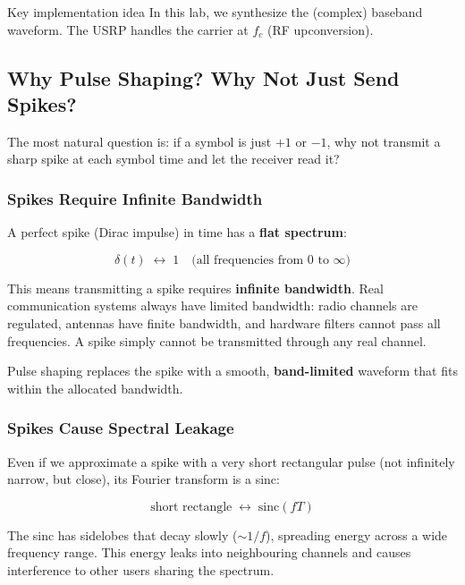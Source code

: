 \begin{KeyBox}{Key implementation idea}
In this lab, we synthesize the (complex) baseband waveform. The USRP handles the carrier at $f_c$ (RF upconversion).
\end{KeyBox}

\subsection{Why Pulse Shaping? Why Not Just Send Spikes?}

The most natural question is: if a symbol is just $+1$ or $-1$, why not transmit a sharp spike at each symbol time and let the receiver read it?

\subsubsection{Spikes Require Infinite Bandwidth}

A perfect spike (Dirac impulse) in time has a \textbf{flat spectrum}:

\begin{equation}
\delta(t) \;\longleftrightarrow\; 1 \quad \text{(all frequencies from 0 to } \infty\text{)}
\end{equation}

This means transmitting a spike requires \textbf{infinite bandwidth}. Real communication systems always have limited bandwidth: radio channels are regulated, antennas have finite bandwidth, and hardware filters cannot pass all frequencies. A spike simply cannot be transmitted through any real channel.

Pulse shaping replaces the spike with a smooth, \textbf{band-limited} waveform that fits within the allocated bandwidth.

\subsubsection{Spikes Cause Spectral Leakage}

Even if we approximate a spike with a very short rectangular pulse (not infinitely narrow, but close), its Fourier transform is a sinc:

\begin{equation}
\text{short rectangle} \;\longleftrightarrow\; \mathrm{sinc}(fT)
\end{equation}

The sinc has sidelobes that decay slowly ($\sim 1/f$), spreading energy across a wide frequency range. This energy leaks into neighbouring channels and causes interference to other users sharing the spectrum.

